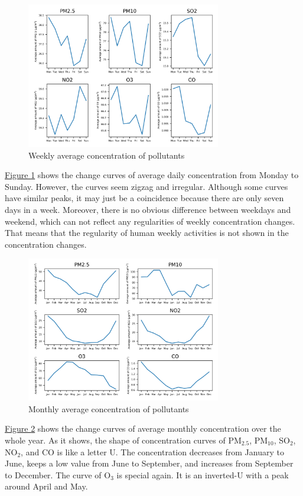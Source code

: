 \documentclass[letterpaper]{article}
\begin{document}
\begin{CJK*}{UTF8}{gkai}
\begin{figure}[h]
  \includegraphics[width = 8.5cm]{weekavg_pltn.png}
  \caption{Weekly average concentration of pollutants}
  \label{figure:3}
\end{figure}

\hyperref[figure:3]{Figure \ref*{figure:3}} shows the change curves of average daily concentration from Monday to Sunday. However, the curves seem zigzag and irregular. Although some curves have similar peaks, it may just be a coincidence because there are only seven days in a week. Moreover, there is no obvious difference between weekdays and weekend, which can not reflect any regularities of weekly concentration changes. That means that the regularity of human weekly activities is not shown in the concentration changes.

\begin{figure}[h]
  \includegraphics[width = 8.5cm]{monavg_pltn.png}
  \caption{Monthly average concentration of pollutants}
  \label{figure:4}
\end{figure}

\hyperref[figure:4]{Figure \ref*{figure:4}} shows the change curves of average monthly concentration over the whole year. As it shows, the shape of concentration curves of PM$_{2.5}$, PM$_{10}$, SO$_{2}$, NO$_{2}$, and CO is like a letter U. The concentration decreases from January to June, keeps a low value from June to September, and increases from September to December. The curve of O$_{3}$ is special again. It is an inverted-U with a peak around April and May.


\end{CJK*}
\end{document}
